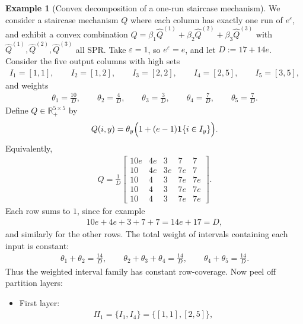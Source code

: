 \documentclass{article}
\theoremstyle{plain}
\theoremstyle{definition}
\newtheorem{example}[theorem]{Example}
\theoremstyle{plain}
\newcommand{\eps}{\varepsilon}
\begin{document}
\begin{example}[Convex decomposition of a one-run staircase mechanism]
\label{ex:convex-decomposition-spr}
We consider a staircase mechanism $Q$ where each column has exactly one run of $e^\eps$, and exhibit a convex combination $Q=\beta_1\widehat Q^{(1)}+\beta_2\widehat Q^{(2)}+\beta_3\widehat Q^{(3)}$ with $\widehat Q^{(1)}, \widehat Q^{(2)}, \widehat Q^{(3)}$ all SPR. Take \(\varepsilon=1\), so \(e^\varepsilon=e\), and let $D:=17+14e$.
Consider the five output columns with high sets
\begin{align*}
    I_1=[1,1],\qquad
    I_2=[1,2],\qquad
    I_3=[2,2],\qquad
    I_4=[2,5],\qquad
    I_5=[3,5],
\end{align*}
and weights
\begin{align*}
    \theta_1=\frac{10}{D},\qquad
    \theta_2=\frac{4}{D},\qquad
    \theta_3=\frac{3}{D},\qquad
    \theta_4=\frac{7}{D},\qquad
    \theta_5=\frac{7}{D}.
\end{align*}
Define \(Q\in\mathbb R_+^{5\times 5}\) by
\begin{align*}
    Q(i,y)=\theta_y\Bigl(1+(e-1)\mathbf 1\{i\in I_y\}\Bigr).
\end{align*}
Equivalently,
\begin{align*}
    Q=
    \frac1D
    \begin{bmatrix}
    10e & 4e & 3 & 7 & 7\\
    10  & 4e & 3e& 7e& 7\\
    10  & 4  & 3 & 7e& 7e\\
    10  & 4  & 3 & 7e& 7e\\
    10  & 4  & 3 & 7e& 7e
    \end{bmatrix}.
\end{align*}
Each row sums to \(1\), since for example
\begin{align*}
    10e+4e+3+7+7=14e+17=D,
\end{align*}
and similarly for the other rows. The total weight of intervals containing each input is constant:
\begin{align*}
    \theta_1+\theta_2=\frac{14}{D},\qquad
    \theta_2+\theta_3+\theta_4=\frac{14}{D},\qquad
    \theta_4+\theta_5=\frac{14}{D}.
\end{align*}
Thus the weighted interval family has constant row-coverage. Now peel off partition layers:
\begin{itemize}
\item First layer:
\begin{align*}
    \Pi_1=\{I_1,I_4\}=\{[1,1],[2,5]\},
    \qquad

\end{align*}
\end{itemize}
\end{example}
\end{document}
